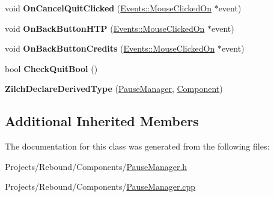 \begin{DoxyCompactItemize}
\item 
\hypertarget{classDCEngine_1_1Components_1_1PauseManager_ab7fe7bb2ba2139ebcb6854614df11732}{void {\bfseries On\-Cancel\-Quit\-Clicked} (\hyperlink{classDCEngine_1_1Events_1_1MouseClickedOn}{Events\-::\-Mouse\-Clicked\-On} $\ast$event)}\label{classDCEngine_1_1Components_1_1PauseManager_ab7fe7bb2ba2139ebcb6854614df11732}

\item 
\hypertarget{classDCEngine_1_1Components_1_1PauseManager_aa104f76662876d97067a683cc28c4de8}{void {\bfseries On\-Back\-Button\-H\-T\-P} (\hyperlink{classDCEngine_1_1Events_1_1MouseClickedOn}{Events\-::\-Mouse\-Clicked\-On} $\ast$event)}\label{classDCEngine_1_1Components_1_1PauseManager_aa104f76662876d97067a683cc28c4de8}

\item 
\hypertarget{classDCEngine_1_1Components_1_1PauseManager_ab2f76b8d033e0eac88be0e2ef96a52fc}{void {\bfseries On\-Back\-Button\-Credits} (\hyperlink{classDCEngine_1_1Events_1_1MouseClickedOn}{Events\-::\-Mouse\-Clicked\-On} $\ast$event)}\label{classDCEngine_1_1Components_1_1PauseManager_ab2f76b8d033e0eac88be0e2ef96a52fc}

\item 
\hypertarget{classDCEngine_1_1Components_1_1PauseManager_a1ce96c26f1943fe8700c537065368b59}{bool {\bfseries Check\-Quit\-Bool} ()}\label{classDCEngine_1_1Components_1_1PauseManager_a1ce96c26f1943fe8700c537065368b59}

\item 
\hypertarget{classDCEngine_1_1Components_1_1PauseManager_acda9b4e92018798b14c0cbe8ef129e13}{{\bfseries Zilch\-Declare\-Derived\-Type} (\hyperlink{classDCEngine_1_1Components_1_1PauseManager}{Pause\-Manager}, \hyperlink{classDCEngine_1_1Component}{Component})}\label{classDCEngine_1_1Components_1_1PauseManager_acda9b4e92018798b14c0cbe8ef129e13}

\end{DoxyCompactItemize}
\subsection*{Additional Inherited Members}


The documentation for this class was generated from the following files\-:\begin{DoxyCompactItemize}
\item 
Projects/\-Rebound/\-Components/\hyperlink{PauseManager_8h}{Pause\-Manager.\-h}\item 
Projects/\-Rebound/\-Components/\hyperlink{PauseManager_8cpp}{Pause\-Manager.\-cpp}\end{DoxyCompactItemize}
